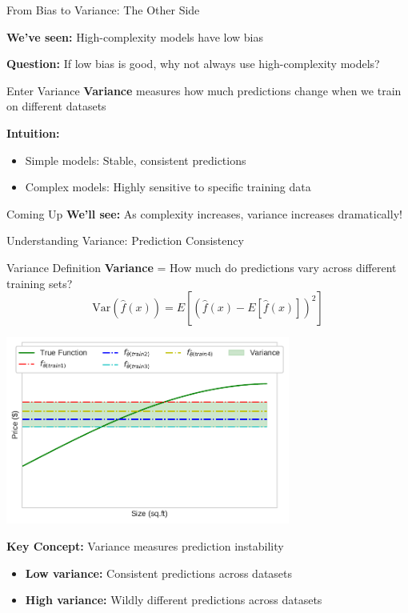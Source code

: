 \documentclass[10pt]{beamer}
\newcommand{\fitpic}[1]{\begin{adjustbox}{max width=\linewidth, max totalheight=0.78\textheight}#1\end{adjustbox}}
\begin{document}
\begin{frame}{From Bias to Variance: The Other Side}
\begin{alertbox}
\textbf{We've seen:} High-complexity models have low bias

\textbf{Question:} If low bias is good, why not always use high-complexity models?
\end{alertbox}

\begin{definitionbox}{Enter Variance}
\textbf{Variance} measures how much predictions change when we train on different datasets
\end{definitionbox}

\begin{keypointsbox}
\textbf{Intuition:} 
\begin{itemize}
\item Simple models: Stable, consistent predictions
\item Complex models: Highly sensitive to specific training data
\end{itemize}
\end{keypointsbox}

\begin{examplebox}{Coming Up}
\textbf{We'll see:} As complexity increases, variance increases dramatically!
\end{examplebox}
\end{frame}

\begin{frame}{Understanding Variance: Prediction Consistency}
\begin{definitionbox}{Variance Definition}
\textbf{Variance} = How much do predictions vary across different training sets?
$$\text{Var}(\hat{f}(x)) = E[(\hat{f}(x) - E[\hat{f}(x)])^2]$$
\end{definitionbox}

\begin{center}
\fitpic{\includegraphics[width=0.7\textwidth]{../assets/bias-variance/figures/var1.pdf}}
\end{center}

\begin{keypointsbox}
\textbf{Key Concept:} Variance measures prediction instability
\begin{itemize}
\item \textbf{Low variance:} Consistent predictions across datasets
\item \textbf{High variance:} Wildly different predictions across datasets
\end{itemize}
\end{keypointsbox}
\end{frame}
\end{document}
